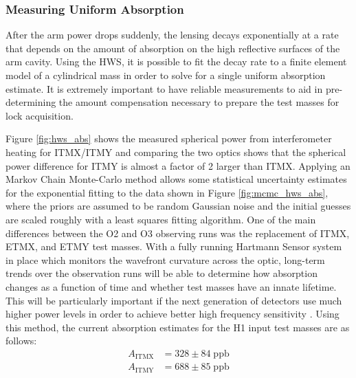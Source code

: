 	\subsubsection{Measuring Uniform Absorption}
	After the arm power drops suddenly, the lensing decays exponentially at a rate that depends on the amount of absorption on the high reflective surfaces of the arm cavity.  Using the HWS, it is possible to fit the decay rate to a finite element model of a cylindrical mass in order to solve for a single uniform absorption estimate.  It is extremely important to have reliable measurements to aid in pre-determining the amount compensation necessary to prepare the test masses for lock acquisition.  
	
	Figure \ref{fig:hws_abs} shows the measured spherical power from interferometer heating for ITMX/ITMY and comparing the two optics shows that the spherical power difference for ITMY is almost a factor of 2 larger than ITMX. Applying an Markov Chain Monte-Carlo method allows some statistical uncertainty estimates for the exponential fitting to the data shown in Figure \ref{fig:mcmc_hws_abs}, where the priors are assumed to be random Gaussian noise and the initial guesses are scaled roughly with a least squares fitting algorithm. One of the main differences between the O2 and O3 observing runs was the replacement of ITMX, ETMX, and ETMY test masses.  With a fully running Hartmann Sensor system in place which monitors the wavefront curvature across the optic, long-term trends over the observation runs will be able to determine how absorption changes as a function of time and whether test masses have an innate lifetime.  This will be particularly important if the next generation of detectors use much higher power levels in order to achieve better high frequency sensitivity \cite{DanBrown_prvt}.  Using this method, the current absorption estimates for the H1 input test masses are as follows:
	\begin{equation}
	\begin{aligned}
	A_{\text{ITMX}} &= 328 \pm 84 \; \text{ppb}\\
	A_{\text{ITMY}} &= 688 \pm 85 \; \text{ppb}
	\end{aligned}
	\end{equation}
